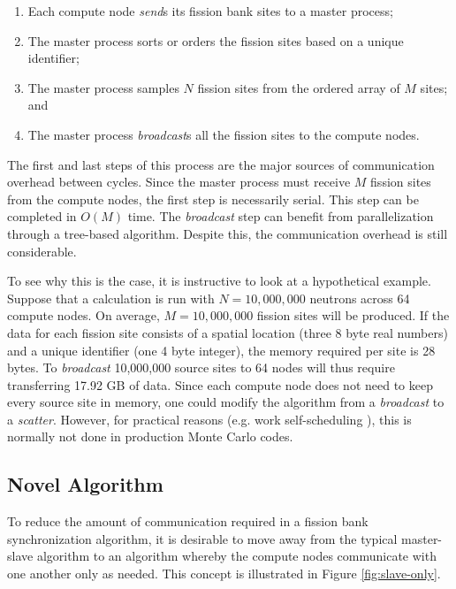 \documentclass[11pt]{article}
\begin{document}
\begin{enumerate}
\item Each compute node \emph{send}s its fission bank sites to a
  master process;
\item The master process sorts or orders \cite{brown-sort} the fission
  sites based on a unique identifier;
\item The master process samples $N$ fission sites from the ordered
  array of $M$ sites; and
\item The master process \emph{broadcast}s all the fission sites to
  the compute nodes.
\end{enumerate}

The first and last steps of this process are the major sources of
communication overhead between cycles. Since the master process must
receive $M$ fission sites from the compute nodes, the first step is
necessarily serial. This step can be completed in $O(M)$ time. The
\emph{broadcast} step can benefit from parallelization through a
tree-based algorithm. Despite this, the communication overhead is
still considerable.

To see why this is the case, it is instructive to look at a
hypothetical example. Suppose that a calculation is run with $N =
10,000,000$ neutrons across 64 compute nodes. On average, $M =
10,000,000$ fission sites will be produced. If the data for each
fission site consists of a spatial location (three 8 byte real
numbers) and a unique identifier (one 4 byte integer), the memory
required per site is 28 bytes. To \emph{broadcast} 10,000,000 source
sites to 64 nodes will thus require transferring 17.92 GB of data.
Since each compute node does not need to keep every source site in
memory, one could modify the algorithm from a \emph{broadcast} to a
\emph{scatter}. However, for practical reasons (e.g. work
self-scheduling \cite{brown-lectures}), this is normally not done in
production Monte Carlo codes.

\subsection{Novel Algorithm}
\label{sec:algorithm}

To reduce the amount of communication required in a fission bank
synchronization algorithm, it is desirable to move away from the
typical master-slave algorithm to an algorithm whereby the compute
nodes communicate with one another only as needed. This concept is
illustrated in Figure \ref{fig:slave-only}.
\end{document}
